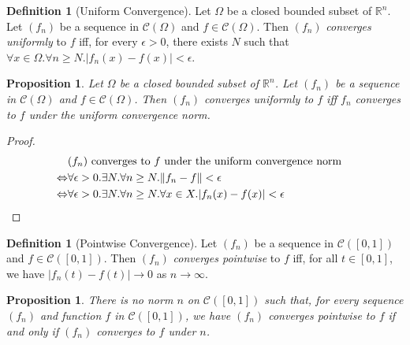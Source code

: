 \documentclass{book}
\let\qed\relax
\newtheorem{prop}[ax]{Proposition}
\theoremstyle{definition}
\newtheorem{df}[ax]{Definition}
\begin{document}
\begin{df}[Uniform Convergence]
Let $\Omega$ be a closed bounded subset of $\mathbb{R}^n$. Let $(f_n)$ be a sequence in $\mathcal{C}(\Omega)$ and $f \in \mathcal{C}(\Omega)$. Then $(f_n)$ \emph{converges uniformly} to $f$ iff, for every $\epsilon > 0$, there exists $N$ such that $\forall x \in \Omega. \forall n \geq N. |f_n(x) - f(x)| < \epsilon$.
\end{df}

\begin{prop}
Let $\Omega$ be a closed bounded subset of $\mathbb{R}^n$. Let $(f_n)$ be a sequence in $\mathcal{C}(\Omega)$ and $f \in \mathcal{C}(\Omega)$. Then $(f_n)$ \emph{converges uniformly} to $f$ iff $f_n$ converges to $f$ under the uniform convergence norm.
\end{prop}

\begin{proof}
\pf
\begin{align*}
& (f_n) \text{ converges to } f \text{ under the uniform convergence norm} \\
\Leftrightarrow & \forall \epsilon > 0. \exists N. \forall n \geq N. \| f_n - f \| < \epsilon \\
\Leftrightarrow & \forall \epsilon > 0. \exists N. \forall n \geq N. \forall x \in X. |f_n(x) - f(x)| < \epsilon & \qed
\end{align*}
\end{proof}

\begin{df}[Pointwise Convergence]
Let $(f_n)$ be a sequence in $\mathcal{C}([0,1])$ and $f \in \mathcal{C}([0,1])$. Then $(f_n)$ \emph{converges pointwise} to $f$ iff, for all $t \in [0,1]$, we have $|f_n(t) - f(t)| \rightarrow 0$ as $n \rightarrow \infty$.
\end{df}

\begin{prop}
There is no norm $n$ on $\mathcal{C}([0,1])$ such that, for every sequence $(f_n)$ and function $f$ in $\mathcal{C}([0,1])$, we have $(f_n)$ converges pointwise to $f$ if and only if $(f_n)$ converges to $f$ under $n$.
\end{prop}
\end{document}
